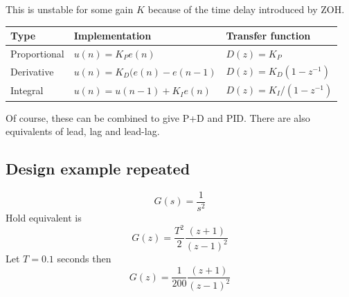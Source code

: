 \begin{slide}\label{slides:l12s15}
	\begin{center}
	\end{center}
	This is unstable for some gain $K$ because of the time delay introduced by ZOH.
\end{slide}

\begin{slide}\label{slides:l12s16}
	\begin{tabular}{|l|l|l|}
	\hline
	\textbf{Type} & \textbf{Implementation} & \textbf{Transfer function} \\
	\hline
	Proportional & $u(n) = K_Pe(n)$ & $D(z)=K_P$ \\
	\hline
	Derivative & $u(n) = K_D(e(n)-e(n-1)$ & $D(z)=K_D(1-z^{-1})$ \\
	\hline
	Integral & $u(n) = u(n-1) + K_Ie(n)$ & $D(z)=K_I/(1-z^{-1})$\\
	\hline
	\end{tabular}
\end{slide}

Of course, these can be combined to give P+D and PID. There are also equivalents of lead, lag and lead-lag.

\subsection*{Design example repeated}

\begin{slide}\label{slides:l12s17}
	$$G(s)=\frac{1}{s^2}$$
	Hold equivalent is
	$$G(z)=\frac{T^2}{2}\frac{(z+1)}{(z-1)^2}$$
	Let $T = 0.1$ seconds then
	$$G(z)=\frac{1}{200}\frac{(z+1)}{(z-1)^2}$$
\end{slide}

